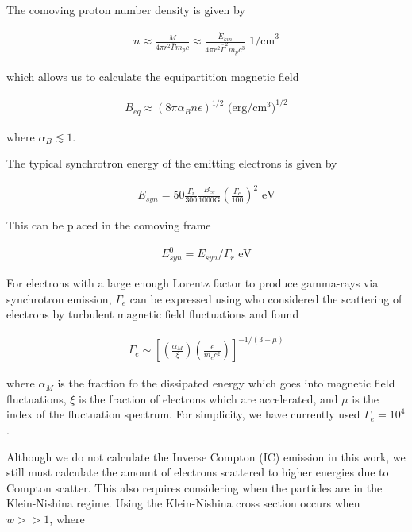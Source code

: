 \documentclass[linenumbers]{aastex631}
\begin{document}
The comoving proton number density is given by 

\begin{align}
	n \approx \frac{\dot{M}}{4\pi r^2 \bar{\Gamma}m_p c} \approx \frac{\dot{E}_{kin}}{4\pi r^2 \bar{\Gamma}^2m_p c^3} \text{ 1/cm}^3
\end{align}

which allows us to calculate the equipartition magnetic field 

\begin{align}
	B_{eq} \approx (8\pi \alpha_B n \epsilon)^{1/2} \text{ (erg/cm$^3$)}^{1/2}
\end{align}

where $\alpha_B\lesssim1$. 

The typical synchrotron energy of the emitting electrons is given by

\begin{align}
	E_{syn} = 50 \frac{\Gamma_r}{300}\frac{B_{eq}}{1000\text{G}}\left(\frac{\Gamma_e}{100}\right)^2 \text{ eV}
\end{align}

This can be placed in the comoving frame 

\begin{align}
	E_{syn}^0 = E_{syn}/\Gamma_r \text{ eV}
\end{align} 

For electrons with a large enough Lorentz factor to produce gamma-rays via synchrotron emission, $\Gamma_e$ can be expressed using \citet{1996ApJ...461L..37B} who considered the scattering of electrons by turbulent magnetic field fluctuations and found 

\begin{align}
	\Gamma_e \sim \left[ \left(\frac{\alpha_M}{\xi}\right)\left(\frac{\epsilon}{m_ec^2}\right) \right]^{-1/(3-\mu)}
\end{align}

where $\alpha_M$ is the fraction fo the dissipated energy which goes into magnetic field fluctuations, $\xi$ is the fraction of electrons which are accelerated, and $\mu$ is the index of the fluctuation spectrum. For simplicity, we have currently used $\Gamma_e=10^4$.

Although we do not calculate the Inverse Compton (IC) emission in this work, we still must calculate the amount of electrons scattered to higher energies due to Compton scatter. This also requires considering when the particles are in the Klein-Nishina regime. Using the Klein-Nishina cross section occurs when $w>>1$, where
\end{document}
